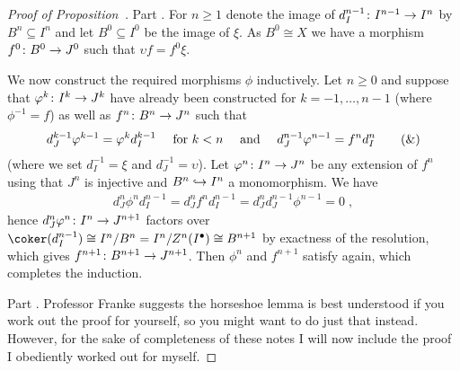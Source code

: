 \documentclass[a4paper,parskip=half,numbers=enddot, DIV=12]{scrreprt}
\begin{document}
\begin{proof}[Proof of Proposition~]
	Part . For $n\geq 1$ denote the image of $d_{I }^{n-1}\colon I^{n-1}\morphism I^n$ by $B^n\subseteq I^n$ and let $B^0\subseteq I^0$ be the image of $\xi$. As $B^0\cong X$ we have a morphism $f^0\colon B^0\morphism J^0$ such that $\upsilon f=f^0\xi$.
	
	We now construct the required morphisms $\phi $ inductively. Let $n\geq 0$ and suppose that $\phi^k\colon I^k\morphism J^k$ have already been constructed for $k=-1,\ldots,n-1$ (where $\phi^{-1}=f$) as well as $f^n\colon B^n\morphism J^n$ such that
	\begin{align}\lbl{eq:Horseshoe1}
		d_{J }^{k-1}\phi^{k-1}=\phi^kd_{I }^{k-1}\quad\text{ for }k< n\quad\text{ and }\quad d_{J  }^{n-1}\phi^{n-1}=f^nd_{I }^n\tag{\&}
	\end{align}
	(where we set $d_{I }^{-1}=\xi$ and $d_{J }^{-1}=\upsilon$). Let $\phi^n\colon I^n\morphism J^n$ be any extension of $f^n$ using that $J^n$ is injective and $B^n\monomorphism I^n$ a monomorphism. We have
	\begin{align*}
		d_{J }^{n}\phi ^nd_{I }^{n-1}=d_{J }^{n}f^nd_{I }^{n-1}=d_{J }^nd_{J }^{n-1}\phi^{n-1}=0\;,
	\end{align*}
	hence $d_{J }^n\phi^n\colon I^n\morphism J^{n+1}$ factors over $\coker(d_{I }^{n-1})\cong I^n/B^n=I^n/Z^n(I^\bullet )\cong B^{n+1}$ by exactness of the resolution, which gives $f^{n+1}\colon B^{n+1}\morphism J^{n+1}$. Then $\phi^n$ and $f^{n+1}$ satisfy  again, which completes the induction.
	
	Part . Professor Franke suggests the horseshoe lemma is best understood if you work out the proof for yourself, so you might want to do just that instead. However, for the sake of completeness of these notes I will now include the proof I obediently worked out for myself.
	

\end{proof}
\end{document}
